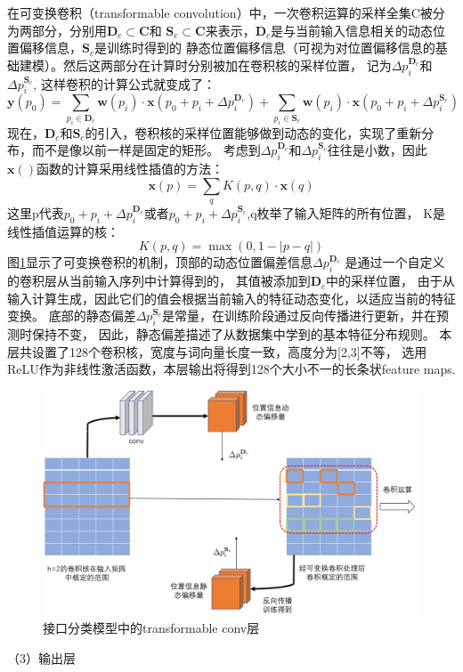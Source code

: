 在可变换卷积（transformable convolution）中，一次卷积运算的采样全集C被分为两部分，分别用$\mathbf{D}_{c} \subset \mathbf{C}$和
$\mathbf{S}_{c} \subset \mathbf{C}$来表示，$\mathbf{D}_{c}$是与当前输入信息相关的动态位置偏移信息，$\mathbf{S}_{c}$是训练时得到的
静态位置偏移信息（可视为对位置偏移信息的基础建模）。然后这两部分在计算时分别被加在卷积核的采样位置，
记为$\Delta p_{i}^{\mathbf{D}_{c}}$和$\Delta p_{i}^{\mathbf{S}_{c}}$,
这样卷积的计算公式就变成了：
\begin{equation}
  \mathbf{y}\left(p_{0}\right)= \sum_{p_{i} \in \mathbf{D}_{c}} \mathbf{w}\left(p_{i}\right) \cdot \mathbf{x}\left(p_{0}+p_{i}+\Delta p_{i}^{\mathbf{D}_{c}}\right) +\sum_{p_{i} \in \mathbf{S}_{c}} \mathbf{w}\left(p_{i}\right) \cdot \mathbf{x}\left(p_{0}+p_{i}+\Delta p_{i}^{\mathbf{S}_{c}}\right)
\end{equation}
现在，$\mathbf{D}_{c}$和$\mathbf{S}_{c}$的引入，卷积核的采样位置能够做到动态的变化，实现了重新分布，而不是像以前一样是固定的矩形。
考虑到$\Delta p_{i}^{\mathbf{D}_{c}}$和$\Delta p_{i}^{\mathbf{S}_{c}}$往往是小数，因此$\mathbf{x}()$函数的计算采用线性插值的方法：
\begin{equation}
\mathbf{x}(p)=\sum_{q} K(p, q) \cdot \mathbf{x}(q)
\end{equation}
这里p代表$p_{0}+p_{i}+\Delta p_{i}^{\mathbf{D}_{c}}$或者$p_{0}+p_{i}+\Delta p_{i}^{\mathbf{S}_{c}}$,q枚举了输入矩阵的所有位置，
K是线性插值运算的核：
\begin{equation}
K(p, q)=\max (0,1-|p-q|)
\end{equation}
图\ref{fig:tansconv}显示了可变换卷积的机制，顶部的动态位置偏差信息$\Delta p_{i}^{\mathbf{D}_{c}}$
是通过一个自定义的卷积层从当前输入序列中计算得到的，
其值被添加到$\mathbf{D}_{c}$中的采样位置，
由于从输入计算生成，因此它们的值会根据当前输入的特征动态变化，以适应当前的特征变换。 
底部的静态偏差$\Delta p_{i}^{\mathbf{S}_{c}}$是常量，在训练阶段通过反向传播进行更新，并在预测时保持不变，
因此，静态偏差描述了从数据集中学到的基本特征分布规则。
本层共设置了128个卷积核，宽度与词向量长度一致，高度分为[2,3]不等，
选用ReLU作为非线性激活函数，本层输出将得到128个大小不一的长条状feature maps.

\begin{figure}[htbp]
  \centering
  \includegraphics[scale=0.4]{./images/tansconv.jpg}
  \caption{接口分类模型中的transformable conv层}
  \label{fig:tansconv}
\end{figure}
（3）输出层

